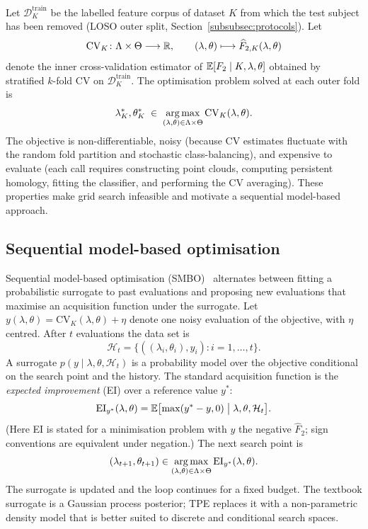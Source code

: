 Let $\mathcal{D}^{\mathrm{train}}_K$ be the labelled feature corpus of dataset $K$ from which the test subject has been removed (LOSO outer split, Section~\ref{subsubsec:protocols}). Let
\[
  \mathrm{CV}_K\colon\Lambda\times\Theta\longrightarrow\mathbb{R},
  \qquad
  (\lambda,\theta)\longmapsto\widehat{F}_{2,K}(\lambda,\theta)
\]
denote the inner cross-validation estimator of $\mathbb{E}[F_2\mid K,\lambda,\theta]$ obtained by stratified $k$-fold CV on $\mathcal{D}^{\mathrm{train}}_K$. The optimisation problem solved at each outer fold is
\begin{equation}
  \lambda^*_K,\theta^*_K\;\in\;\operatorname*{arg\,max}_{(\lambda,\theta)\in\Lambda\times\Theta}\mathrm{CV}_K(\lambda,\theta).
  \label{eq:bayes-objective}
\end{equation}
The objective is non-differentiable, noisy (because CV estimates fluctuate with the random fold partition and stochastic class-balancing), and expensive to evaluate (each call requires constructing point clouds, computing persistent homology, fitting the classifier, and performing the CV averaging). These properties make grid search infeasible and motivate a sequential model-based approach.

\subsection{Sequential model-based optimisation}
\label{subsubsec:smbo}

Sequential model-based optimisation (SMBO)~\parencite{hutter2011sequential} alternates between fitting a probabilistic surrogate to past evaluations and proposing new evaluations that maximise an acquisition function under the surrogate. Let $y(\lambda,\theta)=\mathrm{CV}_K(\lambda,\theta)+\eta$ denote one noisy evaluation of the objective, with $\eta$ centred. After $t$ evaluations the data set is
\[
  \mathcal{H}_t=\bigl\{((\lambda_i,\theta_i),y_i):i=1,\ldots,t\bigr\}.
\]
A surrogate $p(y\mid\lambda,\theta,\mathcal{H}_t)$ is a probability model over the objective conditional on the search point and the history. The standard acquisition function is the \emph{expected improvement} (EI) over a reference value $y^*$:
\begin{equation}
  \operatorname{EI}_{y^*}(\lambda,\theta)=\mathbb{E}\bigl[\max(y^*-y,0)\bigm|\lambda,\theta,\mathcal{H}_t\bigr].
  \label{eq:ei}
\end{equation}
(Here EI is stated for a minimisation problem with $y$ the negative $\widehat F_2$; sign conventions are equivalent under negation.) The next search point is
\begin{equation}
  (\lambda_{t+1},\theta_{t+1})\in\operatorname*{arg\,max}_{(\lambda,\theta)\in\Lambda\times\Theta}\operatorname{EI}_{y^*}(\lambda,\theta).
  \label{eq:smbo-step}
\end{equation}
The surrogate is updated and the loop continues for a fixed budget. The textbook surrogate is a Gaussian process posterior; TPE replaces it with a non-parametric density model that is better suited to discrete and conditional search spaces.

